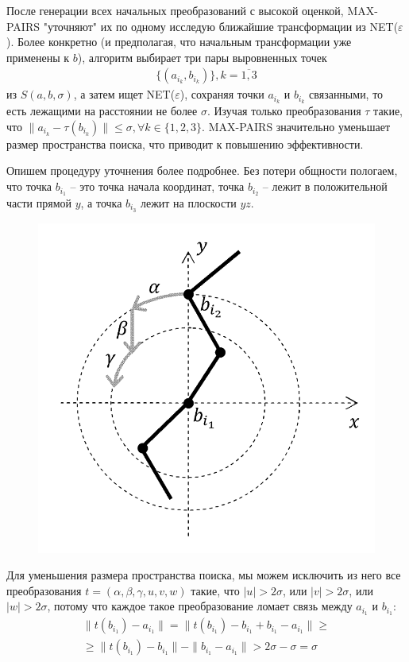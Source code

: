 \documentclass[a4paper]{extreport}
\newcommand{\eps}{\varepsilon}
\begin{document}
После генерации всех начальных преобразований с высокой оценкой, MAX-PAIRS "уточняют" их по одному исследую ближайшие трансформации из NET($\eps$). Более конкретно (и предполагая, что начальным трансформации уже применены к $b$), алгоритм выбирает три пары выровненных точек 
\begin{gather*}
\{(a_{i_k}, b_{i_k})\}, k = \overline{1, 3}
\end{gather*} 
из $S(a, b, \sigma)$, а затем ищет NET($\eps$), сохраняя точки $a_{i_k}$ и $b_{i_k}$ связанными, то есть лежащими на расстоянии не более $\sigma$. Изучая только преобразования $\tau$ такие, что $\| a_{i_k} - \tau(b_{i_k})\| \leq \sigma, \forall k \in \{1, 2, 3 \}$. MAX-PAIRS значительно уменьшает размер пространства поиска, что приводит к повышению эффективности.

Опишем процедуру уточнения более подробнее. Без потери общности пологаем, что точка $b_{i_1}$ -- это точка начала координат, точка $b_{i_2}$ -- лежит в положительной части прямой $y$, а точка $b_{i_3}$ лежит на плоскости $yz$.

\begin{figure}
\caption{}
\includegraphics[scale=2]{../pictures/pic1.png}
\end{figure}

Для уменьшения размера пространства поиска, мы можем исключить из него все преобразования $t=(\alpha, \beta, \gamma, u, v, w)$ такие, что $|u| > 2\sigma$, или $|v| > 2\sigma$, или $|w| > 2\sigma$, потому что каждое такое преобразование ломает связь между $a_{i_1}$ и $b_{i_1}$:
\begin{gather*}
\|t(b_{i_1}) - a_{i_1} \| = \|t(b_{i_1}) - b_{i_1} + b_{i_1} - a_{i_1}\| \geq \\ \geq
\| t(b_{i_1}) - b_{i_1}\| - \|b_{i_1} - a_{i_1}\| > 2\sigma - \sigma = \sigma
\end{gather*}
\end{document}
